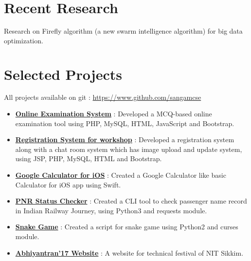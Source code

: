 \documentclass[margin, centered]{res}
\begin{document}
\begin{resume}
        \section{Recent Research}
            Research on Firefly algorithm (a new swarm intelligence algorithm) for big data optimization.

        \section{Selected Projects}
            All projects available on git : \url{https://www.github.com/sangamcse}
            \begin{itemize}[leftmargin=*]
                \item \textbf{\href{https://github.com/sangamcse/online-examination-system}{Online Examination System}} :
                    Developed a MCQ-based online examination tool using PHP, MySQL, HTML, JavaScript and Bootstrap.
                \item \textbf{\href{https://github.com/sangamcse/registration-ESAD}{Registration System for workshop}} :
                    Developed a registration system along with a chat room system which has image upload and update system,
                    using JSP, PHP, MySQL, HTML and Bootstrap.
                \item \textbf{\href{https://github.com/sangamcse/calculator}{Google Calculator for iOS}} : Created a Google
                    Calculator like basic Calculator for iOS app using Swift.
                \item \textbf{\href{https://github.com/sangamcse/myPNRStatus}{PNR Status Checker}} : Created a CLI tool
                    to check passenger name record in Indian Railway Journey, using Python3 and requests module.
                \item \textbf{\href{https://github.com/sangamcse/Snake_game}{Snake Game}} : Created a script for snake game using
                    Python2 and curses module.
                \item \textbf{\href{http://abhiyantran.nitsikkim.ac.in/abhiyantran-17/}{Abhiyantran'17 Website}} : A website for technical festival of NIT Sikkim.
            \end{itemize}


\end{resume}
\end{document}
